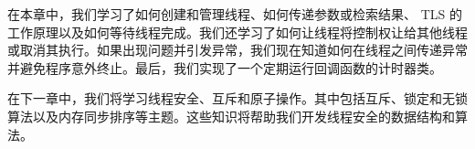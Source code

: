 

在本章中，我们学习了如何创建和管理线程、如何传递参数或检索结果、 TLS 的工作原理以及如何等待线程完成。我们还学习了如何让线程将控制权让给其他线程或取消其执行。如果出现问题并引发异常，我们现在知道如何在线程之间传递异常并避免程序意外终止。最后，我们实现了一个定期运行回调函数的计时器类。

在下一章中，我们将学习线程安全、互斥和原子操作。其中包括互斥、锁定和无锁算法以及内存同步排序等主题。这些知识将帮助我们开发线程安全的数据结构和算法。